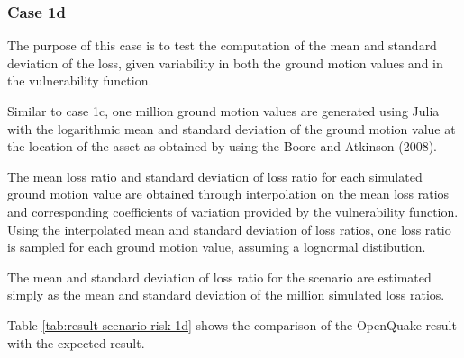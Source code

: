 \subsubsection{Case 1d}
The purpose of this case is to test the computation of the mean and standard deviation of the loss, given variability in both the ground motion values and in the vulnerability function.

Similar to case 1c, one million ground motion values are generated using Julia with the logarithmic mean and standard deviation of the ground motion value at the location of the asset as obtained by using the Boore and Atkinson (2008).

The mean loss ratio and standard deviation of loss ratio for each simulated ground motion value are obtained through interpolation on the mean loss ratios and corresponding coefficients of variation provided by the vulnerability function. Using the interpolated mean and standard deviation of loss ratios, one loss ratio is sampled for each ground motion value, assuming a lognormal distibution.

The mean and standard deviation of loss ratio for the scenario are estimated simply as the mean and standard deviation of the million simulated loss ratios.



Table \ref{tab:result-scenario-risk-1d} shows the comparison of the OpenQuake result with the expected result.